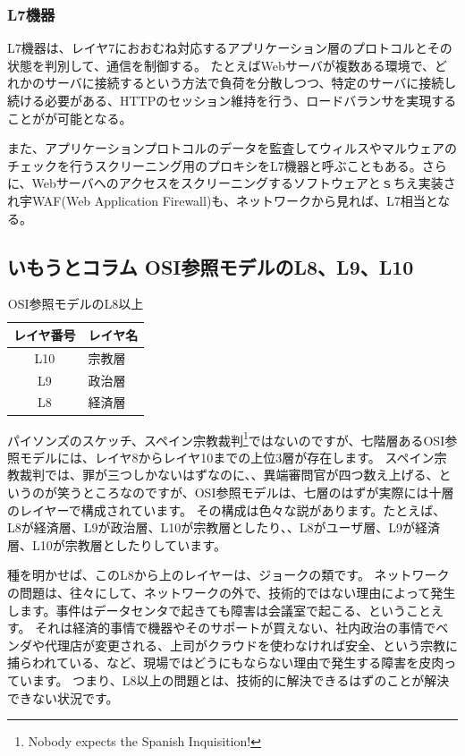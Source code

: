 \subsubsection{L7機器}

L7機器は、レイヤ7におおむね対応するアプリケーション層のプロトコルとその状態を判別して、通信を制御する。
たとえばWebサーバが複数ある環境で、どれかのサーバに接続するという方法で負荷を分散しつつ、特定のサーバに接続し続ける必要がある、HTTPのセッション維持を行う、ロードバランサを実現することがが可能となる。

また、アプリケーションプロトコルのデータを監査してウィルスやマルウェアのチェックを行うスクリーニング用のプロキシをL7機器と呼ぶこともある。さらに、Webサーバへのアクセスをスクリーニングするソフトウェアとｓちえ実装され宇WAF(Web Application Firewall)も、ネットワークから見れば、L7相当となる。

\subsection*{いもうとコラム OSI参照モデルのL8、L9、L10}

\begin{table}[hbtp] 
\begin{center} \label{osirm}
	\begin{tabular}{cl} \toprule 
		レイヤ番号 & レイヤ名 \\ \midrule
		L10 & 宗教層 \\
		L9 & 政治層 \\
		L8 & 経済層 \\ \bottomrule
	\end{tabular}
\end{center} \caption{OSI参照モデルのL8以上}
\end{table} 


パイソンズのスケッチ、スペイン宗教裁判\footnote{Nobody expects the Spanish Inquisition!}ではないのですが、七階層あるOSI参照モデルには、レイヤ8からレイヤ10までの上位3層が存在します。
スペイン宗教裁判では、罪が三つしかないはずなのに、、異端審問官が四つ数え上げる、というのが笑うところなのですが、OSI参照モデルは、七層のはずが実際には十層のレイヤーで構成されています。
その構成は色々な説があります。たとえば、L8が経済層、L9が政治層、L10が宗教層としたり、、L8がユーザ層、L9が経済層、L10が宗教層としたりしています。

種を明かせば、このL8から上のレイヤーは、ジョークの類です。
ネットワークの問題は、往々にして、ネットワークの外で、技術的ではない理由によって発生します。事件はデータセンタで起きても障害は会議室で起こる、ということえす。
それは経済的事情で機器やそのサポートが買えない、社内政治の事情でベンダや代理店が変更される、上司がクラウドを使わなければ安全、という宗教に捕らわれている、など、現場ではどうにもならない理由で発生する障害を皮肉っています。
つまり、L8以上の問題とは、技術的に解決できるはずのことが解決できない状況です。

